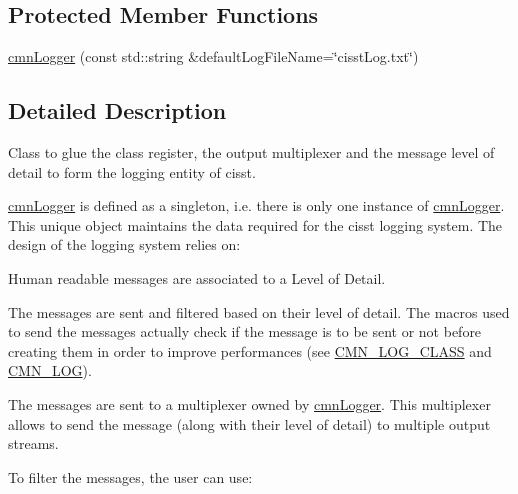 \subsection*{Protected Member Functions}
\begin{DoxyCompactItemize}
\item 
\hyperlink{classcmn_logger_a5069a284c0793277466a6aa967ff41f8}{cmn\-Logger} (const std\-::string \&default\-Log\-File\-Name=\char`\"{}cisst\-Log.\-txt\char`\"{})
\end{DoxyCompactItemize}


\subsection{Detailed Description}
Class to glue the class register, the output multiplexer and the message level of detail to form the logging entity of cisst. 

\hyperlink{classcmn_logger}{cmn\-Logger} is defined as a singleton, i.\-e. there is only one instance of \hyperlink{classcmn_logger}{cmn\-Logger}. This unique object maintains the data required for the cisst logging system. The design of the logging system relies on\-:


\begin{DoxyItemize}
\item Human readable messages are associated to a Level of Detail.
\item The messages are sent and filtered based on their level of detail. The macros used to send the messages actually check if the message is to be sent or not before creating them in order to improve performances (see \hyperlink{cmn_logger_8h_a3fa9ee12c1a4d138c2594449aaf23729}{C\-M\-N\-\_\-\-L\-O\-G\-\_\-\-C\-L\-A\-S\-S} and \hyperlink{cmn_logger_8h_a2eb3b40558ec17c9ae45197777aca7b2}{C\-M\-N\-\_\-\-L\-O\-G}).
\item The messages are sent to a multiplexer owned by \hyperlink{classcmn_logger}{cmn\-Logger}. This multiplexer allows to send the message (along with their level of detail) to multiple output streams.
\end{DoxyItemize}

To filter the messages, the user can use\-:


